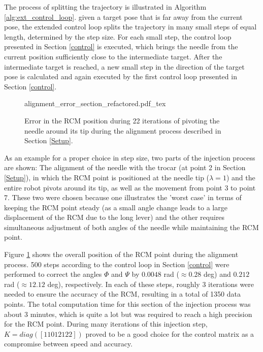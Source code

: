 The process of splitting the trajectory is illustrated in Algorithm \ref{alg:ext_control_loop}. given a target pose that is far away from the current pose, the extended control loop splits the trajectory in many small steps of equal length, determined by the step size. For each small step, the control loop presented in Section \ref{control} is executed, which brings the needle from the current position sufficiently close to the intermediate target. After the intermediate target is reached, a new small step in the direction of the target pose is calculated and again executed by the first control loop presented in Section \ref{control}.

\begin{figure}[b!]
	\begin{center}
		{alignment_error_section_refactored.pdf_tex}
		\caption{Error in the RCM position during 22 iterations of pivoting the needle around its tip during the alignment process described in Section \ref{Setup}.}
		\label{error_align_overall}
	\end{center}
\end{figure}

As an example for a proper choice in step size, two parts of the injection process are shown: The alignment of the needle with the trocar (at point 2 in Section \ref{Setup}), in which the RCM point is positioned at the needle tip ($\lambda=1$) and the entire robot pivots around its tip, as well as the movement from point 3 to point 7. These two were chosen because one illustrates the 'worst case' in terms of keeping the RCM point steady (as a small angle change leads to a large displacement of the RCM due to the long lever) and the other requires simultaneous adjustment of both angles of the needle while maintaining the RCM point.

Figure \ref{error_align_overall} shows the overall position of the RCM point during the alignment process. 500 steps according to the control loop in Section \ref{control} were performed to correct the angles $\Phi$ and $\Psi$ by $0.0048$ rad ($\approx 0.28$ deg) and $0.212$ rad ($\approx 12.12$ deg), respectively. In each of these steps, roughly 3 iterations were needed to ensure the accuracy of the RCM, resulting in a total of 1350 data points. The total computation time for this section of the injection process was about 3 minutes, which is quite a lot but was required to reach a high precision for the RCM point. During many iterations of this injection step, $K=diag([1 10 12 1 2 2])$ proved to be a good choice for the control matrix as a compromise between speed and accuracy.

